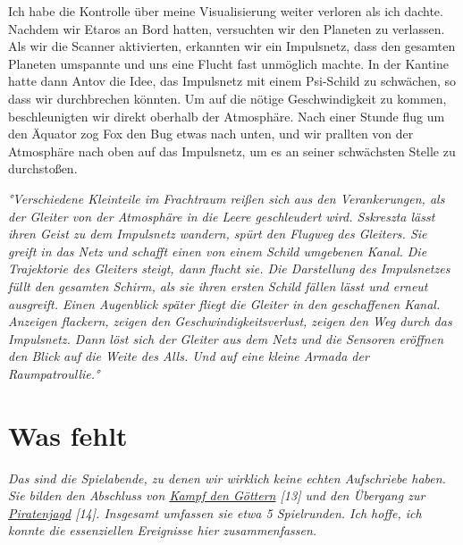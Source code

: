 \documentclass[11pt]{scrartcl}
\begin{document}
Ich habe die Kontrolle über meine Visualisierung weiter verloren als ich
dachte. Nachdem wir Etaros an Bord hatten, versuchten wir den Planeten
zu verlassen. Als wir die Scanner aktivierten, erkannten wir ein
Impulsnetz, dass den gesamten Planeten umspannte und uns eine Flucht
fast unmöglich machte. In der Kantine hatte dann Antov die Idee, das
Impulsnetz mit einem Psi-Schild zu schwächen, so dass wir durchbrechen
könnten. Um auf die nötige Geschwindigkeit zu kommen, beschleunigten wir
direkt oberhalb der Atmosphäre. Nach einer Stunde flug um den Äquator
zog Fox den Bug etwas nach unten, und wir prallten von der Atmosphäre
nach oben auf das Impulsnetz, um es an seiner schwächsten Stelle zu
durchstoßen.

\emph{°Verschiedene Kleinteile im Frachtraum reißen sich aus den
Verankerungen, als der Gleiter von der Atmosphäre in die Leere
geschleudert wird. Sskreszta lässt ihren Geist zu dem Impulsnetz
wandern, spürt den Flugweg des Gleiters. Sie greift in das Netz und
schafft einen von einem Schild umgebenen Kanal. Die Trajektorie des
Gleiters steigt, dann flucht sie. Die Darstellung des Impulsnetzes füllt
den gesamten Schirm, als sie ihren ersten Schild fällen lässt und erneut
ausgreift. Einen Augenblick später fliegt die Gleiter in den
geschaffenen Kanal. Anzeigen flackern, zeigen den
Geschwindigkeitsverlust, zeigen den Weg durch das Impulsnetz. Dann löst
sich der Gleiter aus dem Netz und die Sensoren eröffnen den Blick auf
die Weite des Alls. Und auf eine kleine Armada der Raumpatroullie.°}

\section{Was fehlt}

\emph{Das sind die Spielabende, zu denen wir wirklich keine echten
Aufschriebe haben. Sie bilden den Abschluss von
\href{http://1w6.org/deutsch/kampagnen/waechter-der-zeit/sskresztas-gedaechtniskristall/kampf-den-goettern}{Kampf
den Göttern} {[}13{]} und den Übergang zur
\href{http://1w6.org/deutsch/waechter-der-zeit/aufzeichnungen/sskreszta/piratenjagd}{Piratenjagd}
{[}14{]}. Insgesamt umfassen sie etwa 5 Spielrunden. Ich hoffe, ich
konnte die essenziellen Ereignisse hier zusammenfassen.}
\end{document}

